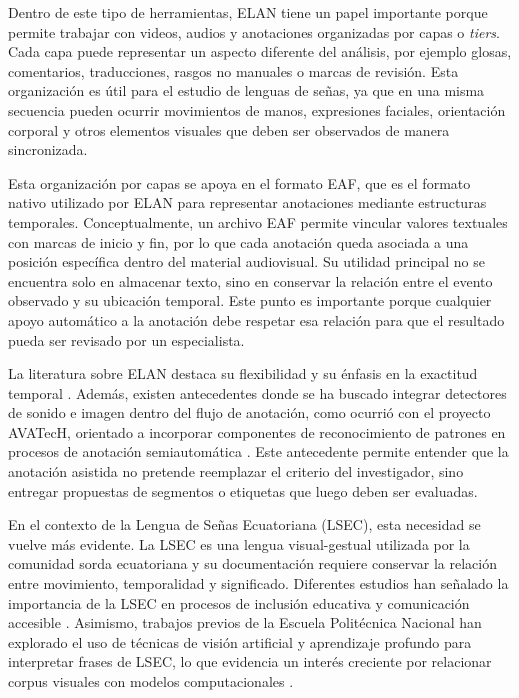 Dentro de este tipo de herramientas, ELAN tiene un papel importante porque permite trabajar con videos, audios y anotaciones organizadas por capas o \textit{tiers}. Cada capa puede representar un aspecto diferente del análisis, por ejemplo glosas, comentarios, traducciones, rasgos no manuales o marcas de revisión. Esta organización es útil para el estudio de lenguas de señas, ya que en una misma secuencia pueden ocurrir movimientos de manos, expresiones faciales, orientación corporal y otros elementos visuales que deben ser observados de manera sincronizada.

Esta organización por capas se apoya en el formato EAF, que es el formato nativo utilizado por ELAN para representar anotaciones mediante estructuras temporales. Conceptualmente, un archivo EAF permite vincular valores textuales con marcas de inicio y fin, por lo que cada anotación queda asociada a una posición específica dentro del material audiovisual. Su utilidad principal no se encuentra solo en almacenar texto, sino en conservar la relación entre el evento observado y su ubicación temporal. Este punto es importante porque cualquier apoyo automático a la anotación debe respetar esa relación para que el resultado pueda ser revisado por un especialista.

La literatura sobre ELAN destaca su flexibilidad y su énfasis en la exactitud temporal \cite{wittenburg2006elan}. Además, existen antecedentes donde se ha buscado integrar detectores de sonido e imagen dentro del flujo de anotación, como ocurrió con el proyecto AVATecH, orientado a incorporar componentes de reconocimiento de patrones en procesos de anotación semiautomática \cite{auer2010elan}. Este antecedente permite entender que la anotación asistida no pretende reemplazar el criterio del investigador, sino entregar propuestas de segmentos o etiquetas que luego deben ser evaluadas.

En el contexto de la Lengua de Señas Ecuatoriana (LSEC), esta necesidad se vuelve más evidente. La LSEC es una lengua visual-gestual utilizada por la comunidad sorda ecuatoriana y su documentación requiere conservar la relación entre movimiento, temporalidad y significado. Diferentes estudios han señalado la importancia de la LSEC en procesos de inclusión educativa y comunicación accesible \cite{ureta2022lsec_inclusion}. Asimismo, trabajos previos de la Escuela Politécnica Nacional han explorado el uso de técnicas de visión artificial y aprendizaje profundo para interpretar frases de LSEC, lo que evidencia un interés creciente por relacionar corpus visuales con modelos computacionales \cite{guevara2022lsec_interprete}.

